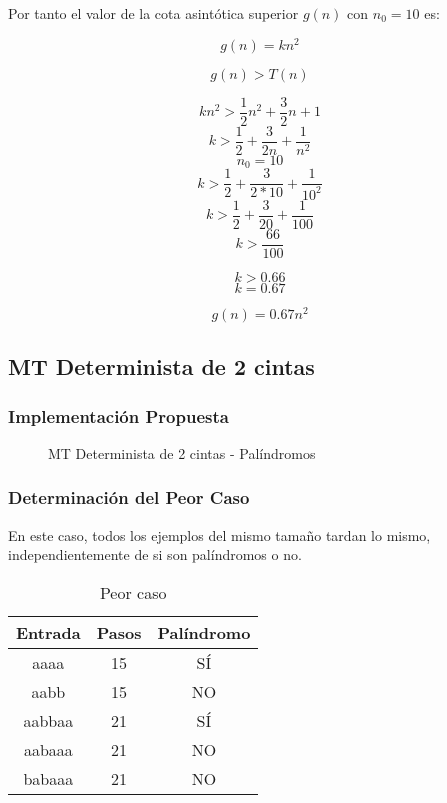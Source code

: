 \documentclass{uc3mpracticas}
\begin{document}
  Por tanto el valor de la cota asintótica superior $g(n)$ con $n_0 = 10$ es:

  $$ g(n) = kn^2 $$

  $$ g(n) > T(n) $$

  $$ kn^2 > \frac{1}{2}n^2 + \frac{3}{2}n + 1 $$
  $$ k > \frac{1}{2} + \frac{3}{2n} + \frac{1}{n^2}$$
  $$ n_0 = 10 $$
  $$ k > \frac{1}{2} + \frac{3}{2 * 10} + \frac{1}{10^2}$$
  $$ k > \frac{1}{2} + \frac{3}{20} + \frac{1}{100}$$
  $$ k > \frac{66}{100}$$

  $$ k > 0.66 $$
  $$ k = 0.67 $$

  $$ g(n) = 0.67n^2 $$






  \subsection{MT Determinista de 2 cintas}

  \subsubsection{Implementación Propuesta}


  \begin{figure}[!h]
    \caption{MT Determinista de 2 cintas - Palíndromos}
  \end{figure}

  \newpage

  \subsubsection{Determinación del Peor Caso}

  En este caso, todos los ejemplos del mismo tamaño tardan lo mismo, independientemente de si son palíndromos o no.


  \begin{table}[!h]
    \centering
  \begin{tabular}{|c|c|c|}
  \hline

  \textbf{Entrada} & \textbf{Pasos} & \textbf{Palíndromo} \\ \hline

  aaaa             & 15             & SÍ                  \\ \hline
  aabb             & 15             & NO                  \\ \hline
  aabbaa           & 21             & SÍ                  \\ \hline
  aabaaa           & 21             & NO                  \\ \hline
  babaaa           & 21             & NO                  \\ \hline
  \end{tabular}
  \caption{Peor caso}
  \end{table}
\end{document}

